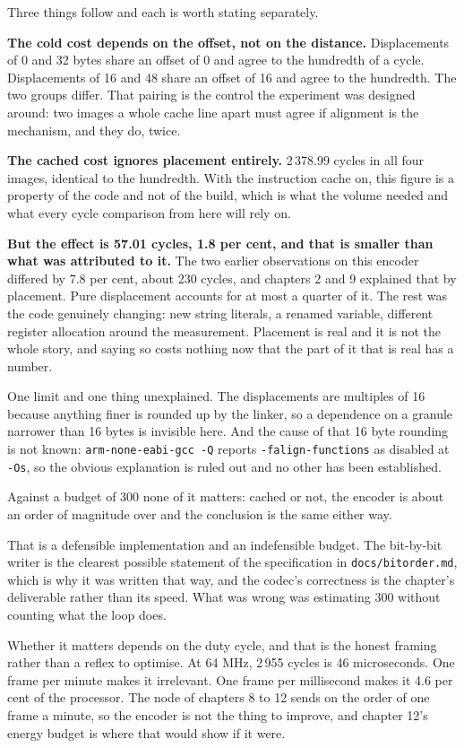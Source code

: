 Three things follow and each is worth stating separately.

\textbf{The cold cost depends on the offset, not on the distance.} Displacements
of 0 and 32 bytes share an offset of 0 and agree to the hundredth of a cycle.
Displacements of 16 and 48 share an offset of 16 and agree to the hundredth. The
two groups differ. That pairing is the control the experiment was designed around:
two images a whole cache line apart must agree if alignment is the mechanism, and
they do, twice.

\textbf{The cached cost ignores placement entirely.} 2\,378.99 cycles in all four
images, identical to the hundredth. With the instruction cache on, this figure is a
property of the code and not of the build, which is what the volume needed and what
every cycle comparison from here will rely on.

\textbf{But the effect is 57.01 cycles, 1.8 per cent, and that is smaller than what
was attributed to it.} The two earlier observations on this encoder differed by 7.8
per cent, about 230 cycles, and chapters 2 and 9 explained that by placement. Pure
displacement accounts for at most a quarter of it. The rest was the code genuinely
changing: new string literals, a renamed variable, different register allocation
around the measurement. Placement is real and it is not the whole story, and saying
so costs nothing now that the part of it that is real has a number.

One limit and one thing unexplained. The displacements are multiples of 16 because
anything finer is rounded up by the linker, so a dependence on a granule narrower
than 16 bytes is invisible here. And the cause of that 16 byte rounding is not
known: \texttt{arm-none-eabi-gcc -Q} reports \texttt{-falign-functions} as
disabled at \texttt{-Os}, so the obvious explanation is ruled out and no other has
been established.

Against a budget of 300 none of it matters: cached or not, the encoder is about an
order of magnitude over and the conclusion is the same either way.

That is a defensible implementation and an indefensible budget. The bit-by-bit
writer is the clearest possible statement of the specification in
\texttt{docs/bitorder.md}, which is why it was written that way, and the codec's
correctness is the chapter's deliverable rather than its speed. What was wrong was
estimating 300 without counting what the loop does.

Whether it matters depends on the duty cycle, and that is the honest framing rather
than a reflex to optimise. At 64 MHz, 2\,955 cycles is 46 microseconds. One frame
per minute makes it irrelevant. One frame per millisecond makes it 4.6 per cent of
the processor. The node of chapters 8 to 12 sends on the order of one frame a
minute, so the encoder is not the thing to improve, and chapter 12's energy budget
is where that would show if it were.

